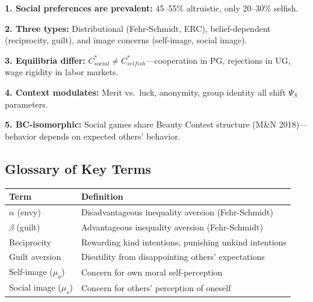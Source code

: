 \begin{tcolorbox}[colback=green!5!white, colframe=green!75!black,
    title=\textbf{Key Takeaways}]

\textbf{1. Social preferences are prevalent:} 45--55\% altruistic, only 20--30\% selfish.

\textbf{2. Three types:} Distributional (Fehr-Schmidt, ERC), belief-dependent
(reciprocity, guilt), and image concerns (self-image, social image).

\textbf{3. Equilibria differ:} $C^*_{social} \neq C^*_{selfish}$---cooperation
in PG, rejections in UG, wage rigidity in labor markets.

\textbf{4. Context modulates:} Merit vs.\ luck, anonymity, group identity all
shift $\Psi_S$ parameters.

\textbf{5. BC-isomorphic:} Social games share Beauty Contest structure
(M\&N 2018)---behavior depends on expected others' behavior.

\end{tcolorbox}

\subsection{Glossary of Key Terms}
\label{sec:aj-glossary}


\begin{center}
\renewcommand{\arraystretch}{1.3}
\begin{tabular}{@{}p{3.5cm}p{9.5cm}@{}}
\toprule
\textbf{Term} & \textbf{Definition} \\
\midrule
$\alpha$ (envy) & Disadvantageous inequality aversion (Fehr-Schmidt) \\
$\beta$ (guilt) & Advantageous inequality aversion (Fehr-Schmidt) \\
Reciprocity & Rewarding kind intentions, punishing unkind intentions \\
Guilt aversion & Disutility from disappointing others' expectations \\
Self-image ($\mu_a$) & Concern for own moral self-perception \\
Social image ($\mu_s$) & Concern for others' perception of oneself \\
\bottomrule
\end{tabular}
\end{center}

